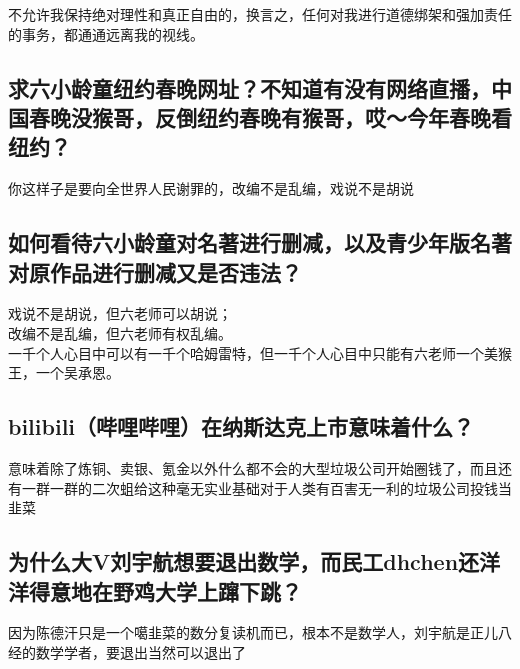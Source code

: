 \documentclass{ctexart}
\begin{document}
			\indent 不允许我保持绝对理性和真正自由的，换言之，任何对我进行道德绑架和强加责任的事务，都通通远离我的视线。

		\subsection{求六小龄童纽约春晚网址？不知道有没有网络直播，中国春晚没猴哥，反倒纽约春晚有猴哥，哎～今年春晚看纽约？}
			你这样子是要向全世界人民谢罪的，改编不是乱编，戏说不是胡说

		\subsection{如何看待六小龄童对名著进行删减，以及青少年版名著对原作品进行删减又是否违法？}
			\noindent 戏说不是胡说，但六老师可以胡说；\\

			\noindent 改编不是乱编，但六老师有权乱编。\\

			\noindent 一千个人心目中可以有一千个哈姆雷特，但一千个人心目中只能有六老师一个美猴王，一个吴承恩。

		\subsection{bilibili（哔哩哔哩）在纳斯达克上市意味着什么？}
			意味着除了炼铜、卖银、氪金以外什么都不会的大型垃圾公司开始圈钱了，而且还有一群一群的二次蛆给这种毫无实业基础对于人类有百害无一利的垃圾公司投钱当韭菜

		\subsection{为什么大V刘宇航想要退出数学，而民工dhchen还洋洋得意地在野鸡大学上蹿下跳？}
			因为陈德汗只是一个噶韭菜的数分复读机而已，根本不是数学人，刘宇航是正儿八经的数学学者，要退出当然可以退出了
\end{document}

